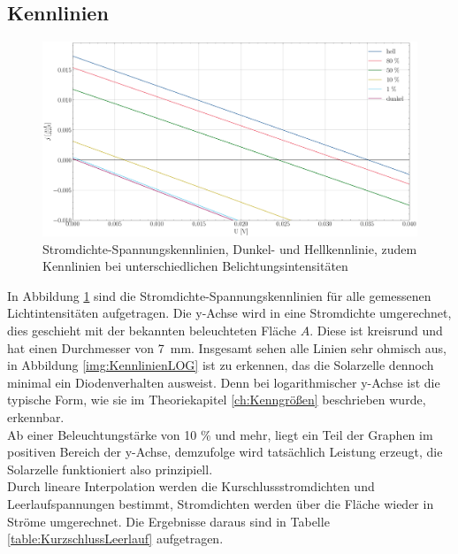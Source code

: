 \documentclass[12pt,a4paper,ngerman]{report}
\begin{document}
\subsection{Kennlinien}
\begin{figure}
	\centering
	\includegraphics[width=\textwidth]{Bilder/Kennlinien.pdf}
	\caption[Stromdichte-Spannungskennlinien]{Stromdichte-Spannungskennlinien, Dunkel- und Hellkennlinie, zudem Kennlinien bei unterschiedlichen Belichtungsintensitäten}
	\label{img:Kennlinien}
\end{figure}
In Abbildung \ref{img:Kennlinien} sind die Stromdichte-Spannungskennlinien für alle gemessenen Lichtintensitäten aufgetragen. Die y-Achse wird in eine Stromdichte umgerechnet, dies geschieht mit der bekannten beleuchteten Fläche $A$. Diese ist kreisrund und hat einen Durchmesser von \SI{7}{\milli \meter}. Insgesamt sehen alle Linien sehr ohmisch aus, in Abbildung \ref{img:KennlinienLOG} ist zu erkennen, das die Solarzelle dennoch minimal ein Diodenverhalten ausweist. Denn bei logarithmischer y-Achse ist die typische Form, wie sie im Theoriekapitel \ref{ch:Kenngrößen} beschrieben wurde, erkennbar.\\
Ab einer Beleuchtungstärke von 10 \% und mehr, liegt ein Teil der Graphen im positiven Bereich der y-Achse, demzufolge wird tatsächlich Leistung erzeugt, die Solarzelle funktioniert also prinzipiell.\\
Durch lineare Interpolation werden die Kurschlussstromdichten und Leerlaufspannungen bestimmt, Stromdichten werden über die Fläche wieder in Ströme umgerechnet. Die Ergebnisse daraus sind in Tabelle \ref{table:KurzschlussLeerlauf} aufgetragen. 
\end{document}
